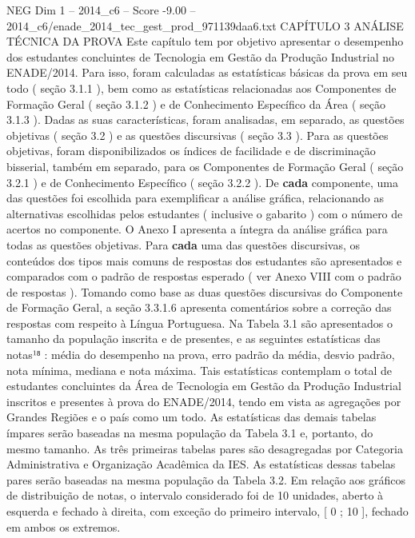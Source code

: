 \begin{textsample}{NEG Dim 1 – 2014\_c6 – Score -9.00 – 2014\_c6/enade\_2014\_tec\_gest\_prod\_971139daa6.txt}  \label{ex:f1_neg_010}
CAPÍTULO 3 ANÁLISE TÉCNICA DA PROVA Este capítulo tem por objetivo apresentar o desempenho dos estudantes concluintes de Tecnologia em Gestão da Produção Industrial no ENADE/2014.
Para isso, foram calculadas as estatísticas básicas da prova em seu todo ( seção 3.1.1 ), bem como as estatísticas relacionadas aos Componentes de Formação Geral ( seção 3.1.2 ) e de Conhecimento Específico da Área ( seção 3.1.3 ).
Dadas as suas características, foram analisadas, em separado, as questões objetivas ( seção 3.2 ) e as questões discursivas ( seção 3.3 ).
Para as questões objetivas, foram disponibilizados os índices de facilidade e de discriminação bisserial, também em separado, para os Componentes de Formação Geral ( seção 3.2.1 ) e de Conhecimento Específico ( seção 3.2.2 ).
De \textbf{cada} componente, uma das questões foi escolhida para exemplificar a análise gráfica, relacionando as alternativas escolhidas pelos estudantes ( inclusive o gabarito ) com o número de acertos no componente.
O Anexo I apresenta a íntegra da análise gráfica para todas as questões objetivas.
Para \textbf{cada} uma das questões discursivas, os conteúdos dos tipos mais comuns de respostas dos estudantes são apresentados e comparados com o padrão de respostas esperado ( ver Anexo VIII com o padrão de respostas ).
Tomando como base as duas questões discursivas do Componente de Formação Geral, a seção 3.3.1.6 apresenta comentários sobre a correção das respostas com respeito à Língua Portuguesa.
Na Tabela 3.1 são apresentados o tamanho da população inscrita e de presentes, e as seguintes estatísticas das notas¹⁸ : média do desempenho na prova, erro padrão da média, desvio padrão, nota mínima, mediana e nota máxima.
Tais estatísticas contemplam o total de estudantes concluintes da Área de Tecnologia em Gestão da Produção Industrial inscritos e presentes à prova do ENADE/2014, tendo em vista as agregações por Grandes Regiões e o país como um todo.
As estatísticas das demais tabelas ímpares serão baseadas na mesma população da Tabela 3.1 e, portanto, do mesmo tamanho.
As três primeiras tabelas pares são desagregadas por Categoria Administrativa e Organização Acadêmica da IES.
As estatísticas dessas tabelas pares serão baseadas na mesma população da Tabela 3.2.
Em relação aos gráficos de distribuição de notas, o intervalo considerado foi de 10 unidades, aberto à esquerda e fechado à direita, com exceção do primeiro intervalo, [ 0 ; 10 ], fechado em ambos os extremos.

\end{textsample}
